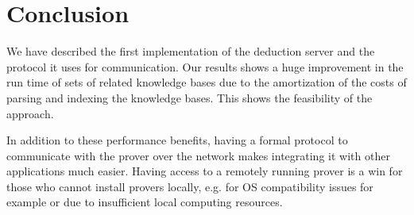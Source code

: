 \chapter{Conclusion}\label{chap:concl}

We have described the first implementation of the deduction server and the protocol it uses for communication. Our results shows a huge improvement in the run time of sets of related knowledge bases due to the amortization of the costs of parsing and indexing the knowledge bases. This shows the feasibility of the approach.

 In addition to these performance benefits, having a formal protocol to communicate with the prover over the network makes integrating it with other applications much easier. Having access to a remotely running prover is a win for those who cannot install provers locally, e.g. for OS compatibility issues for example or due to insufficient local computing resources.
